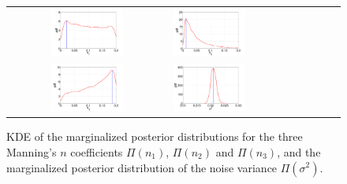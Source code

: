  \begin{figure}[ht]
        \begin{tabular}{clc}
\includegraphics[width=0.475\textwidth]{./figures/pdf_p1.pdf} &
\includegraphics[width=0.475\textwidth]{./figures/pdf_p2.pdf} \\
\includegraphics[width=0.475\textwidth]{./figures/pdf_p3.pdf} &
\includegraphics[width=0.475\textwidth]{./figures/pdf_s1.pdf}
        \end{tabular}
        \caption{KDE of the marginalized posterior distributions for the three Manning's $n$ coefficients 
        $\Pi(n_1)$, $\Pi(n_2)$ and $\Pi(n_3)$, 
and the marginalized posterior distribution of the noise variance 
$\Pi(\sigma^2)$.}
\label{fig:pdfs} 
        \end{figure}
